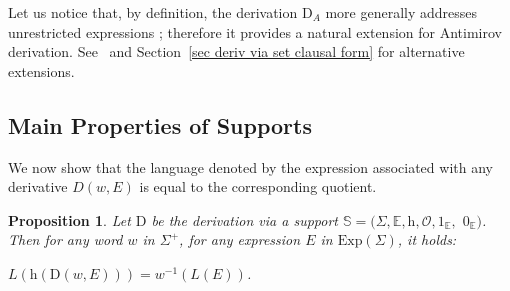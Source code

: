 \documentclass{article}
\newtheorem{proposition}{Proposition}
\begin{document}
    Let us notice that, by definition, the derivation $\mathrm{D}_A$ more generally addresses  unrestricted expressions ; therefore it provides a natural extension for Antimirov derivation. See~\cite{CCM11b} and Section~\ref{sec deriv via set clausal form} for alternative extensions.
   
 
 
 \subsection{Main Properties of Supports}
  
We now show that the language denoted by the expression associated with any derivative $D(w,E)$ is equal to the corresponding quotient. 

 \begin{proposition}\label{preservation du langage}
   Let $\mathrm{D}$ be the derivation via a support $\mathbb{S}=(\Sigma,\mathbb{E},\mathrm{h},\mathcal{O},1_\mathbb{E},$ $0_\mathbb{E})$. Then for any word $w$ in $\Sigma^{+}$, for any expression $E$ in $\mathrm{Exp}(\Sigma)$, it holds:
   
   \centerline{$L(\mathrm{h}(\mathrm{D}(w,E)))=w^{-1}(L(E))$.}
 \end{proposition}
\end{document}

